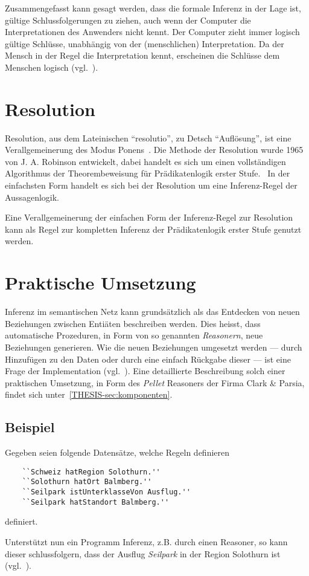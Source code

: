 Zusammengefasst kann gesagt werden, dass die formale Inferenz in der Lage ist, gültige Schlussfolgerungen zu ziehen, auch wenn der Computer die Interpretationen des Anwenders nicht kennt. Der Computer zieht immer logisch gültige Schlüsse, unabhängig von der (menschlichen) Interpretation. Da der Mensch in der Regel die Interpretation kennt, erscheinen die Schlüsse dem Menschen logisch (vgl.~\cite[S. 165]{russel}).

\section{Resolution}
\label{sec:resolution}

Resolution, aus dem Lateinischen ``resolutio'', zu Detsch ``Auflösung'', ist eine Verallgemeinerung des Modus Ponens~\cite[S. 279]{russel}. Die Methode der Resolution wurde 1965 von J. A. Robinson entwickelt, dabei handelt es sich um einen vollständigen Algorithmus der Theorembeweisung für Prädikatenlogik erster Stufe.~\cite[S. 18]{russel} In der einfachsten Form handelt es sich bei der Resolution um eine Inferenz-Regel der Aussagenlogik.~\cite[S. 277]{russel}

Eine Verallgemeinerung der einfachen Form der Inferenz-Regel zur Resolution kann als Regel zur kompletten Inferenz der Prädikatenlogik erster Stufe genutzt werden.~\cite[S. 278]{russel}

\section{Praktische Umsetzung}
\label{sec:inferenz_praktisch}

Inferenz im semantischen Netz kann grundsätzlich als das Entdecken von neuen Beziehungen zwischen Entiäten beschreiben werden. Dies heisst, dass automatische Prozeduren, in Form von so genannten \textit{Reasonern}, neue Beziehungen generieren. Wie die neuen Beziehungen umgesetzt werden --- durch Hinzufügen zu den Daten oder durch eine einfach Rückgabe dieser --- ist eine Frage der Implementation (vgl.~\cite[Abschnitt 1]{w3inference}). Eine detaillierte Beschreibung solch einer praktischen Umsetzung, in Form des \textit{Pellet} Reasoners der Firma Clark \& Parsia, findet sich unter~\ref{THESIS-sec:komponenten}.

\subsection{Beispiel}
\label{subsec:inferenz_beispiel}

Gegeben seien folgende Datensätze, welche Regeln definieren

\begin{lstlisting}
    ``Schweiz hatRegion Solothurn.''
    ``Solothurn hatOrt Balmberg.''
    ``Seilpark istUnterklasseVon Ausflug.''
    ``Seilpark hatStandort Balmberg.''
\end{lstlisting}

definiert.

Unterstützt nun ein Programm Inferenz, z.B. durch einen Reasoner, so kann dieser schlussfolgern, dass der Ausflug \textit{Seilpark} in der Region Solothurn ist (vgl.~\cite[Abschnitt `Examples']{w3inference}).
